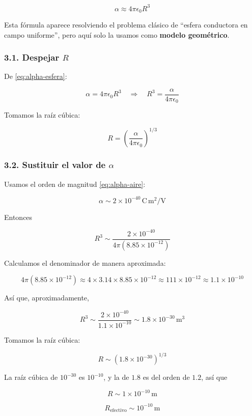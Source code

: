 \documentclass{article}
\begin{document}
\begin{equation}
\alpha \approx 4\pi\epsilon_{0} R^{3}
\label{eq:alpha-esfera}
\end{equation}

Esta fórmula aparece resolviendo el problema clásico de “esfera conductora en campo uniforme”, pero aquí solo la usamos como \textbf{modelo geométrico}.

\subsubsection*{3.1. Despejar $R$}

De \eqref{eq:alpha-esfera}:

\[
\alpha = 4\pi\epsilon_{0}R^{3}
\quad\Longrightarrow\quad
R^{3} = \frac{\alpha}{4\pi\epsilon_{0}}
\]

Tomamos la raíz cúbica:

\begin{equation}
R = \left(\frac{\alpha}{4\pi\epsilon_{0}}\right)^{1/3}
\label{eq:R-from-alpha}
\end{equation}

\subsubsection*{3.2. Sustituir el valor de $\alpha$}

Usamos el orden de magnitud \eqref{eq:alpha-aire}:

\[
\alpha \sim 2\times 10^{-40}\,\text{C}\,\text{m}^{2}/\text{V}
\]

Entonces

\[
R^{3} \sim \frac{2\times 10^{-40}}
{4\pi (8.85\times 10^{-12})}
\]

Calculamos el denominador de manera aproximada:

\[
4\pi(8.85\times 10^{-12})
\approx 4\times 3.14\times 8.85\times 10^{-12}
\approx 111\times 10^{-12}
\approx 1.1\times 10^{-10}
\]

Así que, aproximadamente,

\[
R^{3} \sim \frac{2\times 10^{-40}}{1.1\times 10^{-10}}
\sim 1.8\times 10^{-30}\,\text{m}^{3}
\]

Tomamos la raíz cúbica:

\[
R \sim (1.8\times 10^{-30})^{1/3}
\]

La raíz cúbica de $10^{-30}$ es $10^{-10}$, y la de $1.8$ es del orden de $1.2$, así que

\[
R \sim 1\times 10^{-10}\,\text{m}
\]

\begin{equation}
\boxed{
R_{\text{efectivo}} \sim 10^{-10}\,\text{m}
}
\label{eq:R-valor}
\end{equation}
\end{document}
